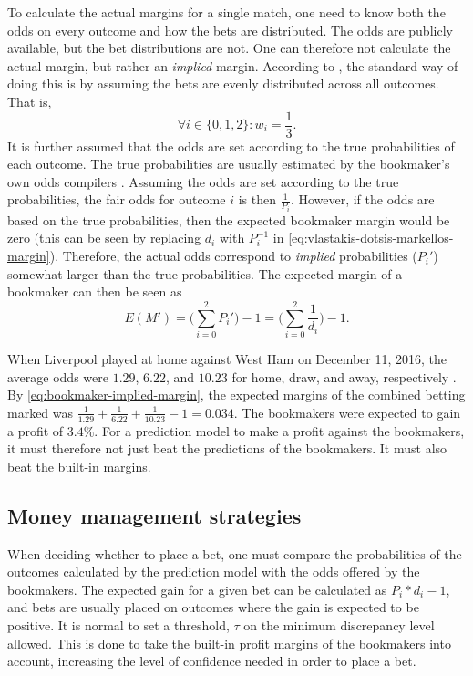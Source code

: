 To calculate the actual margins for a single match, one need to know both the odds on every outcome and how the bets are distributed. The odds are publicly available, but the bet distributions are not. One can therefore not calculate the actual margin, but rather an \textit{implied} margin. According to \citet{bib:vlastakis-dotsis-markellos-2009}, the standard way of doing this is by assuming the bets are evenly distributed across all outcomes. That is,  
\begin{equation*}
    \forall i \in \{0, 1, 2\}: w_{i} = \frac{1}{3}.
\end{equation*}
It is further assumed that the odds are set according to the true probabilities of each outcome. The true probabilities are usually estimated by the bookmaker's own odds compilers \citep{bib:vlastakis-dotsis-markellos-2009}. Assuming the odds are set according to the true probabilities, the fair odds for outcome $i$ is then $\frac{1}{P_{i}}$. However, if the odds are based on the true probabilities, then the expected bookmaker margin would be zero (this can be seen by replacing $d_{i}$ with $P_{i}^{-1}$ in \cref{eq:vlastakis-dotsis-markellos-margin}). Therefore, the actual odds correspond to \textit{implied} probabilities ($P_{i}'$) somewhat larger than the true probabilities. The expected margin of a bookmaker can then be seen as
\begin{equation}
    E(M') = \Bigg(\sum_{i=0}^{2} P_{i}'\Bigg) - 1 = \Bigg(\sum_{i=0}^{2} \frac{1}{d_{i}}\Bigg) - 1.
    \label{eq:bookmaker-implied-margin}
\end{equation}

When Liverpool played at home against West Ham on December 11, 2016, the average odds were $1.29$, $6.22$, and $10.23$ for home, draw, and away, respectively \citep{bib:odds-portal}. By \cref{eq:bookmaker-implied-margin}, the expected margins of the combined betting marked was $\frac{1}{1.29} + \frac{1}{6.22} + \frac{1}{10.23} - 1 = 0.034$. The bookmakers were expected to gain a profit of $3.4\%$. For a prediction model to make a profit against the bookmakers, it must therefore not just beat the predictions of the bookmakers. It must also beat the built-in margins.

\subsection{Money management strategies}
\label{sec:betting-strategies}

When deciding whether to place a bet, one must compare the probabilities of the outcomes calculated by the prediction model with the odds offered by the bookmakers. The expected gain for a given bet can be calculated as $P_{i} * d_{i} - 1$, and bets are usually placed on outcomes where the gain is expected to be positive. It is normal to set a threshold, $\tau$ on the minimum discrepancy level allowed. This is done to take the built-in profit margins of the bookmakers into account, increasing the level of confidence needed in order to place a bet.

